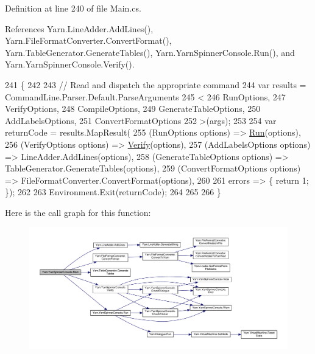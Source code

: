 Definition at line 240 of file Main.\-cs.



References Yarn.\-Line\-Adder.\-Add\-Lines(), Yarn.\-File\-Format\-Converter.\-Convert\-Format(), Yarn.\-Table\-Generator.\-Generate\-Tables(), Yarn.\-Yarn\-Spinner\-Console.\-Run(), and Yarn.\-Yarn\-Spinner\-Console.\-Verify().


\begin{DoxyCode}
241         \{
242 
243             \textcolor{comment}{// Read and dispatch the appropriate command}
244             var results = CommandLine.Parser.Default.ParseArguments
245             <
246             RunOptions,
247             VerifyOptions,
248             CompileOptions,
249             GenerateTableOptions,
250             AddLabelsOptions,
251             ConvertFormatOptions
252             >(args);
253 
254             var returnCode = results.MapResult(
255                 (RunOptions options) => \hyperlink{a00174_a1b974c55540795a9e643c2ec055fbd51}{Run}(options),
256                 (VerifyOptions options) => \hyperlink{a00174_a029a5624e7cc3a16ae586b64f13049de}{Verify}(options),
257                 (AddLabelsOptions options) => LineAdder.AddLines(options),
258                 (GenerateTableOptions options) => TableGenerator.GenerateTables(options),
259                 (ConvertFormatOptions options) => FileFormatConverter.ConvertFormat(options),
260 
261                 errors => \{ \textcolor{keywordflow}{return} 1; \});
262 
263             Environment.Exit(returnCode);
264 
265 
266         \}
\end{DoxyCode}


Here is the call graph for this function\-:
\nopagebreak
\begin{figure}[H]
\begin{center}
\leavevmode
\includegraphics[width=350pt]{a00174_a1d71ff2eb190449ea1d42ce86f44489f_cgraph}
\end{center}
\end{figure}


